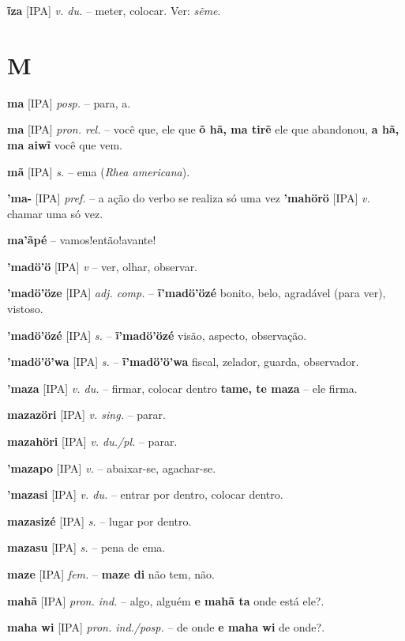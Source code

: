 \textbf{ĩza} [IPA] \textit{v. du.} -- meter, colocar. Ver: \textit{sẽme}.


\section*{M}


\textbf{ma} [IPA] \textit{posp.} -- para, a.

\textbf{ma} [IPA] \textit{pron. rel.} -- você que, ele que  \textbf{õ hã, ma tirẽ} ele que abandonou, \textbf{a hã, ma aiwĩ} você que vem.

\textbf{mã} [IPA] \textit{s.} -- ema (\textit{Rhea americana}).

\textbf{'ma-} [IPA] \textit{pref.} -- a ação do verbo se realiza só uma vez  \textbf{'mahörö} [IPA] \textit{v.} chamar uma só vez.

\textbf{ma'ãpé} -- vamos!então!avante!

\textbf{'madö'ö} [IPA] \textit{v} -- ver, olhar, observar.

\textbf{'madö'öze} [IPA] \textit{adj. comp.} -- \textbf{ĩ'madö'özé} bonito, belo, agradável (para ver), vistoso.

\textbf{'madö'özé} [IPA] \textit{s.} -- \textbf{ĩ'madö'özé} visão, aspecto, observação.

\textbf{'madö'ö'wa} [IPA] \textit{s.} -- \textbf{ĩ'madö'ö'wa} fiscal, zelador, guarda, observador.

\textbf{'maza} [IPA] \textit{v. du.} -- firmar, colocar dentro  \textbf{tame, te maza} -- ele firma.

\textbf{mazazöri} [IPA] \textit{v. sing.} -- parar.

\textbf{mazahöri} [IPA] \textit{v. du./pl.} -- parar.

\textbf{'mazapo} [IPA] \textit{v.} -- abaixar-se, agachar-se.

\textbf{'mazasi} [IPA] \textit{v. du.} -- entrar por dentro, colocar dentro.

\textbf{mazasizé} [IPA] \textit{s.} -- lugar por dentro.

\textbf{mazasu} [IPA] \textit{s.} -- pena de ema.

\textbf{maze} [IPA] \textit{fem.} -- \textbf{maze di} não tem, não.

\textbf{mahã} [IPA] \textit{pron. ind.} -- algo, alguém  \textbf{e mahã ta} onde está ele?.

\textbf{maha wi} [IPA] \textit{pron. ind./posp.} -- de onde  \textbf{e maha wi} de onde?.

